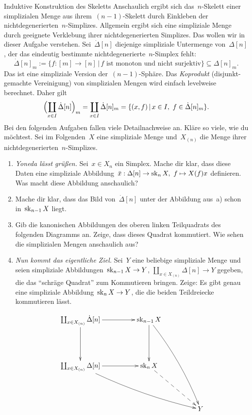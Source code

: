 \documentclass{uebblatt}
\begin{document}
\begin{aufgabe}{Induktive Konstruktion des Skeletts}
Anschaulich ergibt sich das~$n$-Skelett einer simplizialen Menge aus
ihrem~$(n-1)$-Skelett durch Einkleben der nichtdegenerierten~$n$-Simplizes.
Allgemein ergibt sich eine simpliziale Menge durch geeignete Verklebung
ihrer nichtdegenerierten Simplizes. Das wollen wir in dieser Aufgabe verstehen.
Sei~$\dot \Delta[n]$ diejenige simpliziale Untermenge von~$\Delta[n]$, der das
eindeutig bestimmte nichtdegenerierte~$n$-Simplex fehlt:
\[ \dot \Delta[n]_m := \{ f : [m] \to [n] \,|\,
  \text{$f$ ist monoton und nicht surjektiv} \} \subseteq \Delta[n]_m. \]
Das ist eine simpliziale Version der~$(n-1)$-Sphäre.
Das \emph{Koprodukt} (disjunkt-gemachte Vereinigung) von simplizialen Mengen
wird einfach levelweise berechnet. Daher gilt
\[ \Bigl(\coprod_{x \in I} \dot\Delta[n]\Bigr)_m =
  \coprod_{x \in I} \dot\Delta[n]_m =
  \{ (x, f) \,|\, x \in I,\ f \in \dot\Delta[n]_m \}. \]
Bei den folgenden Aufgaben fallen viele Detailnachweise an. Kläre so viele, wie
du möchtest. Sei im Folgenden~$X$ eine simpliziale Menge und~$X_{(n)}$ die
Menge ihrer nichtdegenerierten~$n$-Simplizes.

\begin{enumerate}
\item \emph{Yoneda lässt grüßen.} Sei~$x \in X_n$ ein Simplex. Mache dir
klar, dass diese Daten eine simpliziale Abbildung~$\bar x : \Delta[n] \to \operatorname{sk}_n
X,\ f \mapsto X(f)x$ definieren. Was macht diese Abbildung anschaulich?

\item Mache dir klar, dass das Bild von~$\dot\Delta[n]$ unter der Abbildung
aus~a) schon in~$\operatorname{sk}_{n-1} X$ liegt.

\item Gib die kanonischen Abbildungen des oberen linken Teilquadrats des folgenden
Diagramms an. Zeige, dass dieses Quadrat kommutiert. Wie sehen die simplizialen
Mengen anschaulich aus?

\item \emph{Nun kommt das eigentliche Ziel.} Sei~$Y$ eine beliebige simpliziale
Menge und seien simpliziale Abbildungen~$\operatorname{sk}_{n-1}X \to Y$, $\coprod_{x \in
X_{(n)}} \Delta[n] \to Y$ gegeben, die das "`schräge Quadrat"' zum Kommutieren
bringen. Zeige: Es gibt genau eine simpliziale Abbildung~$\operatorname{sk}_n X \to Y$, die
die beiden Teildreiecke kommutieren lässt.

\[ \xymatrixcolsep{4pc}\xymatrixrowsep{4pc}\xymatrix{
  \coprod_{x \in X_{(n)}} \dot\Delta[n] \ar[r] \ar[d] &
  \sk_{n-1} X \ar[d] \ar@/^/[rdd] \\
  \coprod_{x \in X_{(n)}} \Delta[n] \ar[r] \ar@/_/[rrd] &
  \sk_n X \ar@{-->}[rd] \\
  && Y
} \]


\end{enumerate}
\end{aufgabe}
\end{document}
